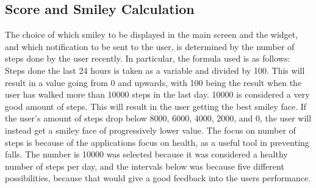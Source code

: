 \subsection{Score and Smiley Calculation}

The choice of which smiley to be displayed in the main screen and the widget, and which notification to be sent to the user, is determined by the number of steps done by the user recently. In particular, the formula used is as follows: 
Steps done the last 24 hours is taken as a variable and divided by 100. This will result in a value going from 0 and upwards, with 100 being the result when the user has walked more than 10000 steps in the last day. 10000 is considered a very good amount of steps. This will result in the user getting the best smiley face. If the user's amount of steps drop below 8000, 6000, 4000, 2000, and 0, the user will instead get a smiley face of progressively lower value.  The focus on number of steps is because of the applications focus on health, as a useful tool in preventing falls. The number is 10000 was selected because it was considered a healthy number of steps per day, and the intervals below was because five different possibilities, because that would give a good feedback into the users performance. 

